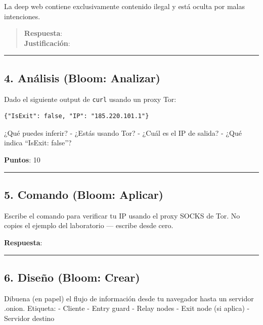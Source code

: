\documentclass[
  letterpaper,
]{report}
\begin{document}
La deep web contiene exclusivamente contenido ilegal y está oculta por
malas intenciones.

\begin{quote}
\textbf{Respuesta}:\\
\textbf{Justificación}:
\end{quote}

\begin{center}\rule{0.5\linewidth}{0.5pt}\end{center}

\subsection{4. Análisis (Bloom:
Analizar)}\label{anuxe1lisis-bloom-analizar}

Dado el siguiente output de \texttt{curl} usando un proxy Tor:

\begin{verbatim}
{"IsExit": false, "IP": "185.220.101.1"}
\end{verbatim}

¿Qué puedes inferir? - ¿Estás usando Tor? - ¿Cuál es el IP de salida? -
¿Qué indica ``IsExit: false''?

\textbf{Puntos}: 10

\begin{center}\rule{0.5\linewidth}{0.5pt}\end{center}

\subsection{5. Comando (Bloom: Aplicar)}\label{comando-bloom-aplicar}

Escribe el comando para verificar tu IP usando el proxy SOCKS de Tor. No
copies el ejemplo del laboratorio --- escribe desde cero.

\textbf{Respuesta}:

\begin{center}\rule{0.5\linewidth}{0.5pt}\end{center}

\subsection{6. Diseño (Bloom: Crear)}\label{diseuxf1o-bloom-crear}

Dibuena (en papel) el flujo de información desde tu navegador hasta un
servidor .onion. Etiqueta: - Cliente - Entry guard - Relay nodes - Exit
node (si aplica) - Servidor destino
\end{document}
